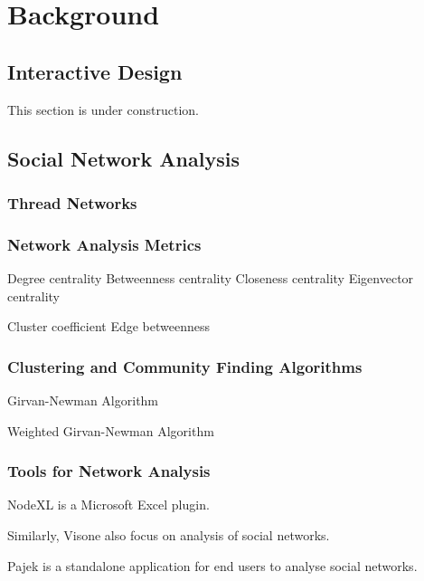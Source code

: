 \chapter{Background} \label{Chapter:Background}

\section{Interactive Design}

This section is under construction.

\section{Social Network Analysis}

\subsection{Thread Networks}

\subsection{Network Analysis Metrics}

Degree centrality
Betweenness centrality
Closeness centrality
Eigenvector centrality

Cluster coefficient
Edge betweenness

\subsection{Clustering and Community Finding Algorithms}

Girvan-Newman Algorithm \cite{Girvan2002}

Weighted Girvan-Newman Algorithm \cite{Newman2004}

\subsection{Tools for Network Analysis}

NodeXL \cite{Hansen2010} is a Microsoft Excel plugin.

Similarly, Visone \cite{Brandes2004} also focus on analysis of social networks.

Pajek \cite{DeNooy2005} is a standalone application for end users to analyse social networks.

